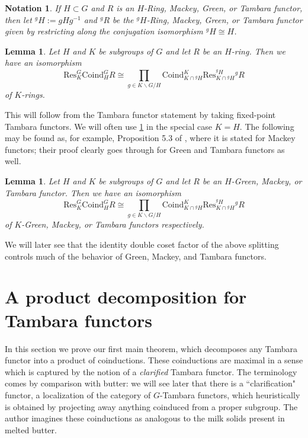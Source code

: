 \documentclass[11pt,dvipsnames]{amsart}
\newtheorem{lemma}[theorem]{Lemma}
\theoremstyle{BoldRemark}
\newtheorem{notation}[theorem]{Notation}
\begin{document}
\begin{notation}
	If $H \subset G$ and $R$ is an $H$-Ring, Mackey, Green, or Tambara functor, then let ${}^g H := gHg^{-1}$ and ${}^g R$ be the ${}^g H$-Ring, Mackey, Green, or Tambara functor given by restricting along the conjugation isomorphism ${}^g H \cong H$.
\end{notation}

\begin{lemma}\label{lem:arbitrary-res-of-coind-of-Gring}
	Let $H$ and $K$ be subgroups of $G$ and let $R$ be an $H$-ring. Then we have an isomorphism 
\[ 
	\mathrm{Res}_K^G \mathrm{Coind}_H^G R \cong \prod_{g \in K \backslash G / H} \mathrm{Coind}_{K \cap {}^g H}^K \mathrm{Res}_{K \cap {}^g H}^{{}^g H} {}^g R 
\] 
of $K$-rings.
\end{lemma}

This will follow from the Tambara functor statement by taking fixed-point Tambara functors. We will often use \cref{lem:arbitrary-res-of-coind-of-Gring} in the special case $K = H$. The following may be found as, for example, Proposition 5.3 of \cite{TW95}, where it is stated for Mackey functors; their proof clearly goes through for Green and Tambara functors as well.

\begin{lemma} \label{lem:arbitrary-res-of-coind-of-HTamb}
	Let $H$ and $K$ be subgroups of $G$ and let $R$ be an $H$-Green, Mackey, or Tambara functor. Then we have an isomorphism 
\[ 
	\mathrm{Res}_K^G \mathrm{Coind}_H^G R \cong \prod_{g \in K \backslash G / H} \mathrm{Coind}_{K \cap {}^g H}^K \mathrm{Res}_{K \cap {}^g H}^{{}^g H} {}^g R 
\] 
of $K$-Green, Mackey, or Tambara functors respectively.
\end{lemma}

We will later see that the identity double coset factor of the above splitting controls much of the behavior of Green, Mackey, and Tambara functors.
\section{A product decomposition for Tambara functors}

In this section we prove our first main theorem, which decomposes any Tambara functor into a product of coinductions. These coinductions are maximal in a sense which is captured by the notion of a \emph{clarified} Tambara functor. The terminology comes by comparison with butter: we will see later that there is a ``clarification" functor, a localization of the category of $G$-Tambara functors, which heuristically is obtained by projecting away anything coinduced from a proper subgroup. The author imagines these coinductions as analogous to the milk solids present in melted butter.
\end{document}
